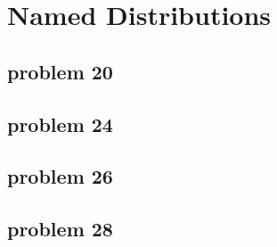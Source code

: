 \section{Named Distributions}

\subsection{problem 20}


\subsection{problem 24}


\subsection{problem 26}


\subsection{problem 28}
